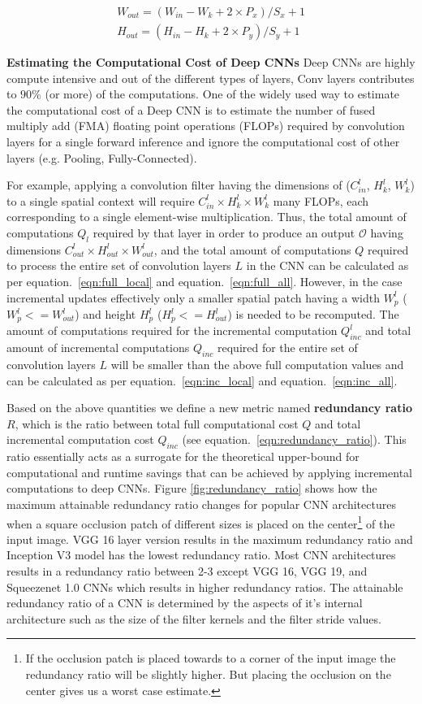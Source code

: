 \begin{align}
W_{out} = (W_{in} - W_k + 2\times P_x)/S_x + 1 \\
H_{out} = (H_{in} - H_k + 2\times P_y)/S_y + 1
\end{align}

\noindent \textbf{Estimating the Computational Cost of Deep CNNs}
Deep CNNs are highly compute intensive and out of the different types of layers, Conv layers contributes to $90\%$ (or more) of the computations. One of the widely used way to estimate the computational cost of a Deep CNN is to estimate the number of fused multiply add (FMA) floating point operations (FLOPs) required by convolution layers for a single forward inference and ignore the computational cost of other layers (e.g. Pooling, Fully-Connected).

For example, applying a convolution filter having the dimensions of ($C^l_{in}$, $H^l_{k}$, $W^l_{k}$) to a single spatial context will require $C^l_{in} \times H^l_{k} \times W^l_{k}$ many FLOPs, each corresponding to a single element-wise multiplication. Thus, the total amount of computations $Q_l$ required by that layer in order to produce an output $\mathcal{O}$ having dimensions $C^l_{out} \times H^l_{out} \times W^l_{out}$, and the total amount of computations $Q$ required to process the entire set of convolution layers $L$ in the CNN can be calculated as per equation.~\ref{eqn:full_local} and equation.~\ref{eqn:full_all}. However, in the case incremental updates effectively only a smaller spatial patch having a width $W^l_p$ ($W^l_p<=W^l_{out}$) and height $H^l_p$ ($H^l_p<=H^l_{out}$) is needed to be recomputed. The amount of computations required for the incremental computation $Q^l_{inc}$ and total amount of incremental computations $Q_{inc}$ required for the entire set of convolution layers $L$ will be smaller than the above full computation values and can be calculated as per equation.~\ref{eqn:inc_local} and equation.~\ref{eqn:inc_all}.

Based on the above quantities we define a new metric named \textbf{redundancy ratio} $R$, which is the ratio between total full computational cost $Q$ and total incremental computation cost $Q_{inc}$ (see equation.~\ref{eqn:redundancy_ratio}). This ratio essentially acts as a surrogate for the theoretical upper-bound for computational and runtime savings that can be achieved by applying incremental computations to deep CNNs. Figure \ref{fig:redundancy_ratio} shows how the maximum attainable redundancy ratio changes for popular CNN architectures when a square occlusion patch of different sizes is placed on the center\footnote{If the occlusion patch is placed towards to a corner of the input image the redundancy ratio will be slightly higher. But placing the occlusion on the center gives us a worst case estimate.} of the input image. VGG 16 layer version results in the maximum redundancy ratio and Inception V3 model has the lowest redundancy ratio. Most CNN architectures results in a redundancy ratio between 2-3 except VGG 16, VGG 19, and Squeezenet 1.0 CNNs which results in higher redundancy ratios. The attainable redundancy ratio of a CNN is determined by the aspects of it's internal architecture such as the size of the filter kernels and the filter stride values.


